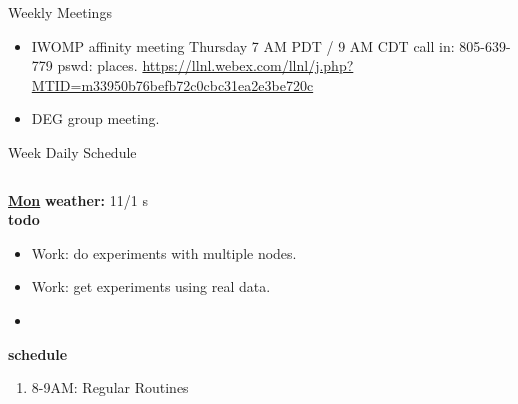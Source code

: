\begin{columns}
\begin{column}{0.6\linewidth}
  \begin{block}{Weekly Meetings}
    \begin{itemize}
      \tiny \item \tiny IWOMP affinity meeting Thursday 7 AM PDT / 9 AM
      CDT call in: 805-639-779 pswd: places. \url{https://llnl.webex.com/llnl/j.php?MTID=m33950b76befb72c0cbc31ea2e3be720c}
    \item \tiny DEG group meeting.          \end{itemize}
  \end{block} 
      \begin{block}{Week Daily Schedule}
        \begin{columns}
          \begin{column}{0.14\textwidth}{\small \underline{\bf Mon}}
            {\tiny \bf {\tiny weather:} } {\tiny 11/1 s} \\ 
            {\tiny \bf {\tiny todo}}\\ 
            \begin{itemize}
              \tiny \item \tiny Work: do experiments with multiple nodes. 
            \item \tiny Work: get experiments using real data.  
            \item \tiny 
            \end{itemize}
                {\small  \bf schedule}\\
                \begin{enumerate} 
                  \tiny \item \tiny 8-9AM: Regular Routines 
                \end{enumerate}
          \end{column}


\end{columns}
\end{block}
\end{column}
\end{columns}
